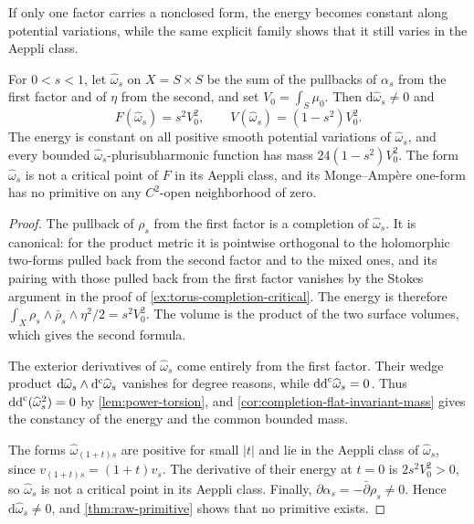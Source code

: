 If only one factor carries a nonclosed form, the energy becomes constant along potential variations, while the same explicit family shows that it still varies in the Aeppli class.

\begin{example}\label{ex:torus-flat-nonstationary}
For $0<s<1$, let $\widehat\omega_s$ on $X=S\times S$ be the sum of the pullbacks of $\alpha_s$ from the first factor and of $\eta$ from the second, and set $V_0=\int_S\mu_0$. Then $\mathrm d\widehat\omega_s\ne0$ and
\[
 F(\widehat\omega_s)=s^2V_0^2,\qquad
 V(\widehat\omega_s)=(1-s^2)V_0^2.
\]
The energy is constant on all positive smooth potential variations of $\widehat\omega_s$, and every bounded $\widehat\omega_s$-plurisubharmonic function has mass $24(1-s^2)V_0^2$. The form $\widehat\omega_s$ is not a critical point of $F$ in its Aeppli class, and its Monge--Amp\`ere one-form has no primitive on any $C^2$-open neighborhood of zero.
\end{example}
\begin{proof}
The pullback of $\rho_s$ from the first factor is a completion of $\widehat\omega_s$. It is canonical: for the product metric it is pointwise orthogonal to the holomorphic two-forms pulled back from the second factor and to the mixed ones, and its pairing with those pulled back from the first factor vanishes by the Stokes argument in the proof of \cref{ex:torus-completion-critical}. The energy is therefore $\int_X\rho_s\wedge\bar\rho_s\wedge\eta^2/2=s^2V_0^2$. The volume is the product of the two surface volumes, which gives the second formula.

The exterior derivatives of $\widehat\omega_s$ come entirely from the first factor. Their wedge product $\mathrm d\widehat\omega_s\wedge\mathrm d^{\mathrm c}\widehat\omega_s$ vanishes for degree reasons, while $\mathrm{dd}^{\mathrm{c}}\widehat\omega_s=0$. Thus $\mathrm{dd}^{\mathrm{c}}(\widehat\omega_s^2)=0$ by \cref{lem:power-torsion}, and \cref{cor:completion-flat-invariant-mass} gives the constancy of the energy and the common bounded mass.

The forms $\widehat\omega_{(1+t)s}$ are positive for small $|t|$ and lie in the Aeppli class of $\widehat\omega_s$, since $v_{(1+t)s}=(1+t)v_s$. The derivative of their energy at $t=0$ is $2s^2V_0^2>0$, so $\widehat\omega_s$ is not a critical point in its Aeppli class. Finally, $\partial\alpha_s=-\bar\partial\rho_s\ne0$. Hence $\mathrm d\widehat\omega_s\ne0$, and \cref{thm:raw-primitive} shows that no primitive exists.
\end{proof}
